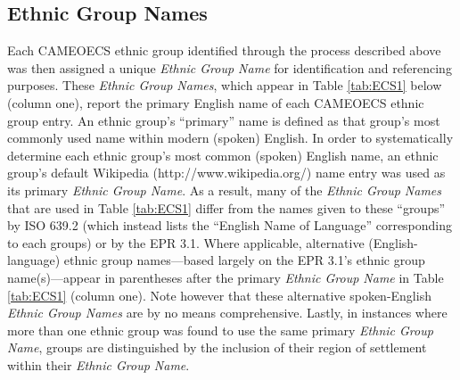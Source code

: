 \documentclass[12pt]{article}
\begin{document}
\subsection{Ethnic Group Names}
	Each CAMEOECS ethnic group identified through the process described above was then assigned a unique \textit{Ethnic Group Name} for identification and referencing purposes.  These \textit{Ethnic Group Names}, which appear in Table \ref{tab:ECS1} below (column one), report the primary English name of each CAMEOECS ethnic group entry.  An ethnic group's ``primary'' name is defined as that group's most commonly used name within modern (spoken) English.  In order to systematically determine each ethnic group's most common (spoken) English name, an ethnic group's default Wikipedia (http://www.wikipedia.org/) name entry was used as its primary \textit{Ethnic Group Name}.  As a result, many of the \textit{Ethnic Group Names} that are used in Table \ref{tab:ECS1} differ from the names given to these ``groups'' by ISO 639.2 (which instead lists the ``English Name of Language'' corresponding to each groups) or by the EPR 3.1.  Where applicable, alternative (English-language) ethnic group names---based largely on the EPR 3.1's ethnic group name(s)---appear in parentheses after the primary \textit{Ethnic Group Name} in Table \ref{tab:ECS1} (column one).  Note however that these alternative spoken-English \textit{Ethnic Group Names} are by no means comprehensive.  Lastly, in instances where more than one ethnic group was found to use the same primary \textit{Ethnic Group Name}, groups are distinguished by the inclusion of their region of settlement within their \textit{Ethnic Group Name}.
\end{document}
